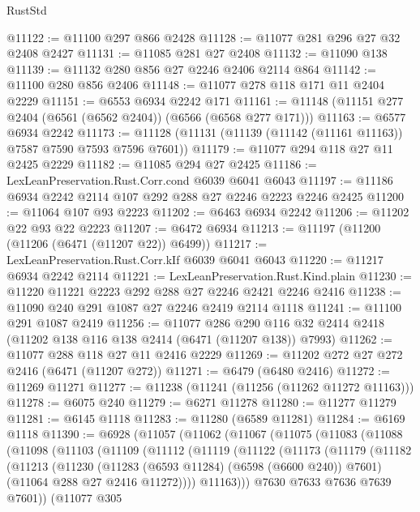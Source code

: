 \begin{lexlean}{RustStd}
\begin{coremodule}
@11122 := @11100 @297 @866 @2428
@11128 := @11077 @281 @296 @27 @32 @2408 @2427
@11131 := @11085 @281 @27 @2408
@11132 := @11090 @138
@11139 := @11132 @280 @856 @27 @2246 @2406 @2114 @864
@11142 := @11100 @280 @856 @2406
@11148 := @11077 @278 @118 @171 @11 @2404 @2229
@11151 := @6553 @6934 @2242 @171
@11161 := @11148 (@11151 @277 @2404 (@6561 (@6562 @2404)) (@6566 (@6568 @277 @171)))
@11163 := @6577 @6934 @2242
@11173 := @11128 (@11131 (@11139 (@11142 (@11161 @11163)) @7587 @7590 @7593 @7596 @7601))
@11179 := @11077 @294 @118 @27 @11 @2425 @2229
@11182 := @11085 @294 @27 @2425
@11186 := LexLeanPreservation.Rust.Corr.cond @6039 @6041 @6043
@11197 := @11186 @6934 @2242 @2114 @107 @292 @288 @27 @2246 @2223 @2246 @2425
@11200 := @11064 @107 @93 @2223
@11202 := @6463 @6934 @2242
@11206 := @11202 @22 @93 @22 @2223
@11207 := @6472 @6934
@11213 := @11197 (@11200 (@11206 (@6471 (@11207 @22)) @6499))
@11217 := LexLeanPreservation.Rust.Corr.kIf @6039 @6041 @6043
@11220 := @11217 @6934 @2242 @2114
@11221 := LexLeanPreservation.Rust.Kind.plain
@11230 := @11220 @11221 @2223 @292 @288 @27 @2246 @2421 @2246 @2416
@11238 := @11090 @240 @291 @1087 @27 @2246 @2419 @2114 @1118
@11241 := @11100 @291 @1087 @2419
@11256 := @11077
    @286
    @290
    @116
    @32
    @2414
    @2418
    (@11202 @138 @116 @138 @2414 (@6471 (@11207 @138)) @7993)
@11262 := @11077 @288 @118 @27 @11 @2416 @2229
@11269 := @11202 @272 @27 @272 @2416 (@6471 (@11207 @272))
@11271 := @6479 (@6480 @2416)
@11272 := @11269 @11271
@11277 := @11238 (@11241 (@11256 (@11262 @11272 @11163)))
@11278 := @6075 @240
@11279 := @6271 @11278
@11280 := @11277 @11279
@11281 := @6145 @1118
@11283 := @11280 (@6589 @11281)
@11284 := @6169 @1118
@11390 := @6928
    (@11057
      (@11062
        (@11067
          (@11075
            (@11083
              (@11088
                (@11098
                  (@11103
                    (@11109
                      (@11112
                        (@11119
                          (@11122
                            (@11173
                              (@11179
                                (@11182
                                  (@11213
                                    (@11230
                                      (@11283 (@6593 @11284) (@6598 (@6600 @240)) @7601)
                                      (@11064 @288 @27 @2416 @11272))))
                                @11163)))
                          @7630
                          @7633
                          @7636
                          @7639
                          @7601))
                      (@11077
                        @305

\end{coremodule}
\end{lexlean}
